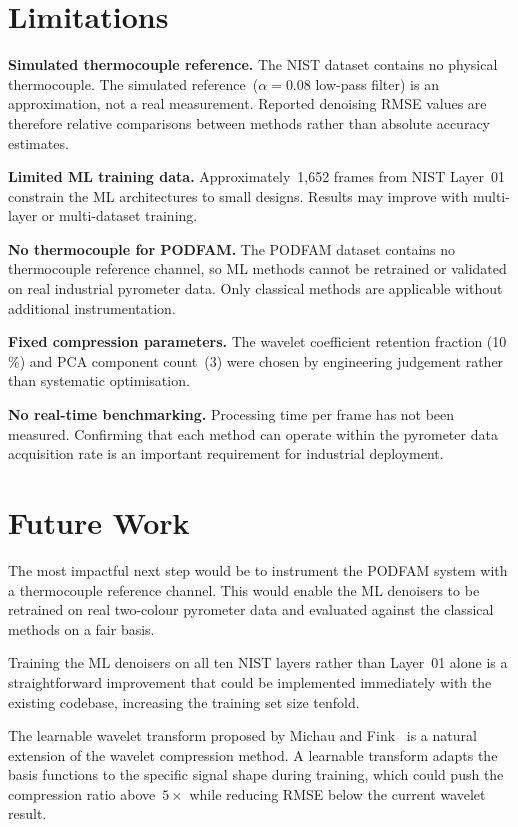 \section{Limitations}
\label{sec:limitations-ch6}

\textbf{Simulated thermocouple reference.} The NIST dataset contains no physical
thermocouple. The simulated reference~($\alpha = 0.08$ low-pass filter) is an
approximation, not a real measurement. Reported denoising RMSE values are
therefore relative comparisons between methods rather than absolute accuracy
estimates.

\textbf{Limited ML training data.} Approximately~1,652 frames from NIST Layer~01
constrain the ML architectures to small designs. Results may improve with
multi-layer or multi-dataset training.

\textbf{No thermocouple for PODFAM.} The PODFAM dataset contains no thermocouple
reference channel, so ML methods cannot be retrained or validated on real
industrial pyrometer data. Only classical methods are applicable without
additional instrumentation.

\textbf{Fixed compression parameters.} The wavelet coefficient retention fraction
(10\,\%) and PCA component count~(3) were chosen by engineering judgement rather
than systematic optimisation.

\textbf{No real-time benchmarking.} Processing time per frame has not been
measured. Confirming that each method can operate within the pyrometer data
acquisition rate is an important requirement for industrial deployment.

\section{Future Work}
\label{sec:future}

The most impactful next step would be to instrument the PODFAM system with a
thermocouple reference channel. This would enable the ML denoisers to be
retrained on real two-colour pyrometer data and evaluated against the classical
methods on a fair basis.

Training the ML denoisers on all ten NIST layers rather than Layer~01 alone is
a straightforward improvement that could be implemented immediately with the
existing codebase, increasing the training set size tenfold.

The learnable wavelet transform proposed by Michau and Fink~\cite{learnable_wavelet}
is a natural extension of the wavelet compression method. A learnable transform
adapts the basis functions to the specific signal shape during training, which
could push the compression ratio above~$5\times$ while reducing RMSE below the
current wavelet result.

